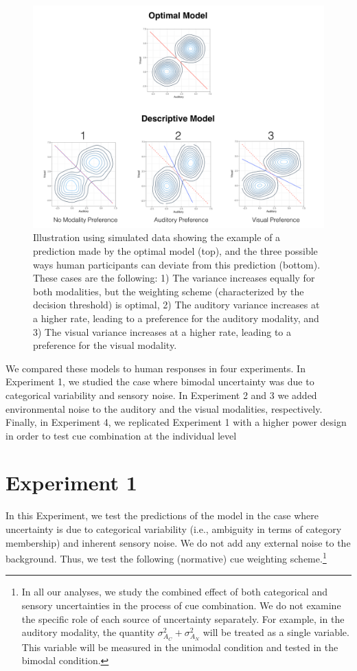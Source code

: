 \documentclass[english,,man,floatsintext]{apa6}
\let\rmarkdownfootnote\footnote%
\def\footnote{\protect\rmarkdownfootnote}
\theoremstyle{definition}
\theoremstyle{definition}
\theoremstyle{definition}
\theoremstyle{remark}
\begin{document}
\begin{figure}[!h]
\includegraphics[width=\textwidth]{pictures/sub-optimal} \caption{Illustration using simulated data showing the example of a prediction made by the optimal model (top), and the three possible ways human participants can deviate from this prediction (bottom). These cases are the following: 1) The variance increases equally for both modalities, but the weighting scheme (characterized by the decision threshold) is optimal, 2) The auditory variance increases at a higher rate, leading to a preference for the auditory modality, and 3) The visual variance increases at a higher rate, leading to a preference for the visual modality.}\label{fig:subOptim}
\end{figure}

We compared these models to human responses in four experiments. In
Experiment 1, we studied the case where bimodal uncertainty was due to
categorical variability and sensory noise. In Experiment 2 and 3 we
added environmental noise to the auditory and the visual modalities,
respectively. Finally, in Experiment 4, we replicated Experiment 1 with
a higher power design in order to test cue combination at the individual
level

\section{Experiment 1}\label{experiment-1}

In this Experiment, we test the predictions of the model in the case
where uncertainty is due to categorical variability (i.e., ambiguity in
terms of category membership) and inherent sensory noise. We do not add
any external noise to the background. Thus, we test the following
(normative) cue weighting scheme.\footnote{In all our analyses, we study
  the combined effect of both categorical and sensory uncertainties in
  the process of cue combination. We do not examine the specific role of
  each source of uncertainty separately. For example, in the auditory
  modality, the quantity \(\sigma^2_{A_C} + \sigma^2_{A_N}\) will be
  treated as a single variable. This variable will be measured in the
  unimodal condition and tested in the bimodal condition.}
\end{document}
